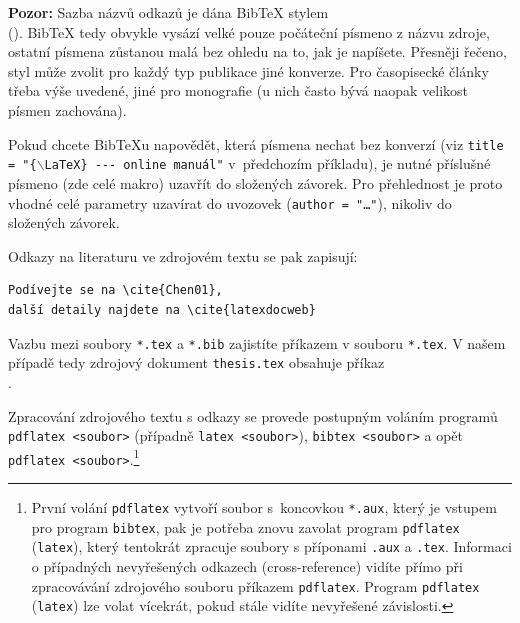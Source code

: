 \documentclass[11pt,twoside,a4paper]{book}
\begin{document}
\begin{itemize}
\textbf{Pozor:} Sazba názvů odkazů je dána Bib\TeX{} stylem\\ (\verb||). 
Bib\TeX{} tedy obvykle vysází velké pouze počáteční písmeno z názvu zdroje, 
ostatní písmena zůstanou malá bez ohledu na to, jak je napíšete. 
Přesněji řečeno, styl může zvolit pro každý typ publikace jiné konverze. 
Pro časopisecké články třeba výše uvedené, jiné pro monografie (u nich často bývá 
naopak velikost písmen zachována).

Pokud chcete Bib\TeX u napovědět, která písmena nechat bez konverzí 
(viz \texttt{title = "\{$\backslash$LaTeX\} -{}-{}- online manuál"} 
v~předchozím příkladu), je nutné příslušné písmeno (zde celé makro) uzavřít 
do složených závorek. Pro přehlednost je proto vhodné celé parametry 
uzavírat do uvozovek (\texttt{author = "\dots"}), nikoliv do složených závorek.

Odkazy na literaturu ve zdrojovém textu se pak zapisují:
\begin{verbatim}
Podívejte se na \cite{Chen01}, 
další detaily najdete na \cite{latexdocweb}
\end{verbatim}

Vazbu mezi soubory \verb|*.tex| a \verb|*.bib| zajistíte příkazem 
\verb|| v souboru \verb|*.tex|.  V našem případě tedy zdrojový 
dokument \verb|thesis.tex| obsahuje příkaz\\
\verb||.

Zpracování zdrojového textu s odkazy se provede postupným voláním programů\\
\verb|pdflatex <soubor>| (případně \verb|latex <soubor>|), \verb|bibtex <soubor>| 
a opět\\ \verb|pdflatex <soubor>|.\footnote{První volání \texttt{pdflatex} 
vytvoří soubor s~koncovkou \texttt{*.aux}, který je vstupem pro program 
\texttt{bibtex}, pak je potřeba znovu zavolat program \texttt{pdflatex} 
(\texttt{latex}), který tentokrát zpracuje soubory s příponami \texttt{.aux} a 
\texttt{.tex}. 
Informaci o případných nevyřešených odkazech (cross-reference) vidíte přímo při 
zpracovávání zdrojového souboru příkazem \texttt{pdflatex}. Program \texttt{pdflatex} 
(\texttt{latex}) lze volat vícekrát, pokud stále vidíte nevyřešené závislosti.}



\end{itemize}
\end{document}
